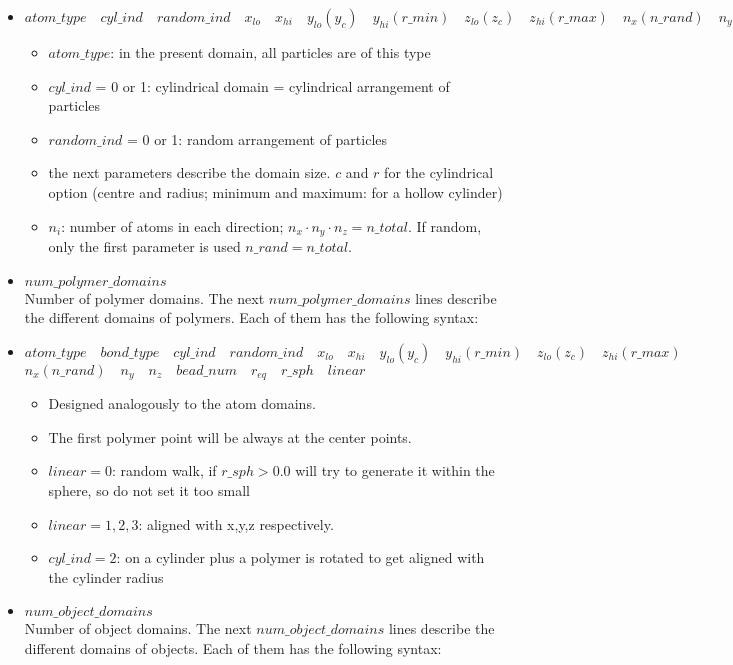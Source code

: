 \begin{itemize}
\item $ atom\_type \quad cyl\_ind \quad random\_ind \quad x_{lo} \quad x_{hi} \quad y_{lo}(y_c) \quad y_{hi}(r\_min) \quad z_{lo}(z_c) \quad z_{hi}(r\_max) \quad n_x(n\_rand) \quad n_y \quad n_z $
	\begin{itemize}
	\item $atom\_type$: in the present domain, all particles are of this type
	\item $cyl\_ind$ = 0 or 1: cylindrical domain = cylindrical arrangement of particles
	\item $random\_ind$ = 0 or 1: random arrangement of particles
	\item the next parameters describe the domain size. $c$ and $r$ for the cylindrical option (centre and radius; minimum and maximum: for a hollow cylinder)
	\item $n_i$: number of atoms in each direction; $n_x \cdot n_y \cdot n_z = n\_total$. If random, only the first parameter is used $n\_rand = n\_total$.
	\end{itemize}

\item $num\_polymer\_domains$ \\
	{Number of polymer domains. The next $num\_polymer\_domains$ lines describe the different domains of polymers. Each of them has the following syntax:}

\item $ atom\_type \quad bond\_type \quad cyl\_ind \quad random\_ind \quad x_{lo} \quad x_{hi} \quad y_{lo}(y_c) \quad y_{hi}(r\_min) \quad z_{lo}(z_c) \quad z_{hi}(r\_max)$\\$ n_x(n\_rand) \quad n_y \quad n_z \quad bead\_num \quad r_{eq} \quad r\_sph \quad linear$
	\begin{itemize}
	\item Designed analogously to the atom domains.
	\item The first polymer point will be always at the center points.
	\item $linear = 0$: random walk, if $r\_sph>0.0$ will try to generate it within the sphere, so do not set it too small
	\item $linear = 1,2,3$: aligned with x,y,z respectively.
	\item $cyl\_ind = 2$: on a cylinder plus a polymer is rotated to get aligned with the cylinder radius
	\end{itemize}

\item $num\_object\_domains$ \\
	{Number of object domains. The next $num\_object\_domains$ lines describe the different domains of objects. Each of them has the following syntax:}


\end{itemize}
